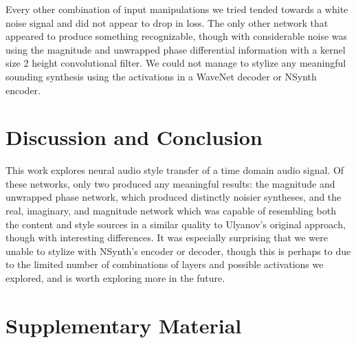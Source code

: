 \documentclass{article}
\begin{document}
Every other combination of input manipulations we tried tended towards a white noise signal and did not appear to drop in loss.  The only other network that appeared to produce something recognizable, though with considerable noise was using the magnitude and unwrapped phase differential information with a kernel size 2 height convolutional filter.  We could not manage to stylize any meaningful sounding synthesis using the activations in a WaveNet decoder or NSynth encoder.


\section{Discussion and Conclusion}

This work explores neural audio style transfer of a time domain audio signal.  Of these networks, only two produced any meaningful results: the magnitude and unwrapped phase network, which produced distinctly noisier syntheses, and the real, imaginary, and magnitude network which was capable of resembling both the content and style sources in a similar quality to Ulyanov's original approach, though with interesting differences.  It was especially surprising that we were unable to stylize with NSynth's encoder or decoder, though this is perhaps to due to the limited number of combinations of layers and possible activations we explored, and is worth exploring more in the future.



\small



\section{Supplementary Material}
\end{document}
